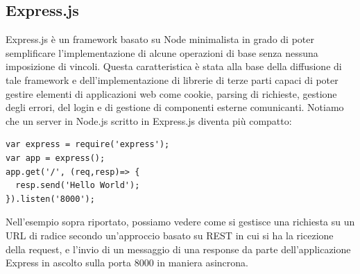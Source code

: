 \subsection{Express.js}
Express.js è un framework basato su Node minimalista in grado di poter semplificare l'implementazione di alcune operazioni di base senza nessuna imposizione di vincoli. Questa caratteristica è stata alla base della diffusione di tale framework e dell'implementazione di librerie di terze parti capaci di poter gestire elementi di applicazioni web come cookie, parsing di richieste, gestione degli errori, del login e di gestione di componenti esterne comunicanti. Notiamo che un server in Node.js scritto in Express.js diventa più compatto:
\begin{lstlisting}
var express = require('express');  
var app = express();  
app.get('/', (req,resp)=> {  
  resp.send('Hello World');  
}).listen('8000');
\end{lstlisting}
Nell'esempio sopra riportato, possiamo vedere come si gestisce una richiesta su un URL di radice secondo un'approccio basato su REST in cui si ha la ricezione della request, e l'invio di un messaggio di una response da parte dell'applicazione Express in ascolto sulla porta 8000 in maniera asincrona.
